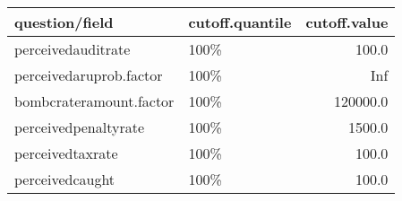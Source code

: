 \begin{table}[ht]
\centering
\begin{tabular}{llr}
  \hline
question/field & cutoff.quantile & cutoff.value \\ 
  \hline
perceivedauditrate & 100\% & 100.0 \\ 
  perceivedaruprob.factor & 100\% & Inf \\ 
  bombcrateramount.factor & 100\% & 120000.0 \\ 
  perceivedpenaltyrate & 100\% & 1500.0 \\ 
  perceivedtaxrate & 100\% & 100.0 \\ 
  perceivedcaught & 100\% & 100.0 \\ 
   \hline
\end{tabular}
\end{table}
